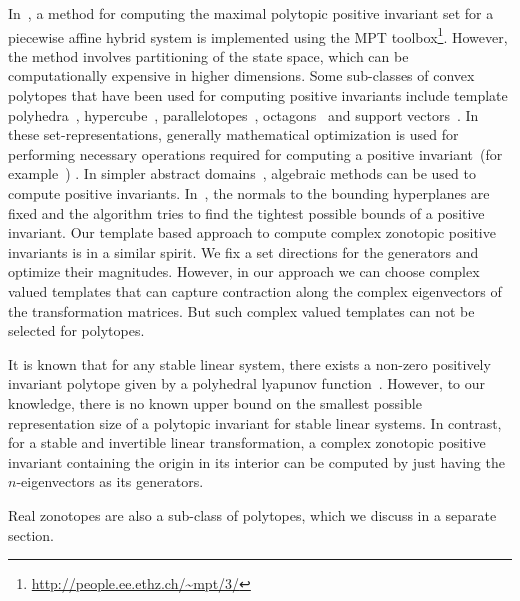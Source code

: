 In~\cite{rakovic2004computation}, a method for computing the maximal
polytopic positive invariant set for a piecewise affine hybrid system
is implemented using the MPT
toolbox\footnote{\url{http://people.ee.ethz.ch/~mpt/3/}}.  However,
the method involves partitioning of the state space, which can be
computationally expensive in higher dimensions.  Some sub-classes of
convex polytopes that have been used for computing positive invariants
include template
polyhedra~\cite{Gawlitza,Sankaranarayanan+Dang+Ivancic-08-Symbolic},
hypercube~\cite{cousot1976static,tiwari2008generating},
parallelotopes~\cite{amato2012abstract},
octagons~\cite{DBLP:journals/lisp/Mine06} and support
vectors~\cite{FLD+11}.  In these set-representations, generally
mathematical optimization is used for performing necessary operations
required for computing a positive invariant~(for
example~\cite{Gawlitza,dang1998reachability}) .  In simpler abstract
domains~\cite{DBLP:journals/lisp/Mine06,cousot1976static,amato2012abstract},
algebraic methods can be used to compute positive invariants.
In~\cite{Gawlitza}, the normals to the bounding hyperplanes are fixed
and the algorithm tries to find the tightest possible bounds
of a positive invariant.  Our template based approach to
compute complex zonotopic positive invariants is in a similar spirit.
We fix a set directions for the generators and optimize their
magnitudes.  However, in our approach we can choose complex valued
templates that can capture contraction along the complex eigenvectors
of the transformation matrices.  But such complex valued templates can
not be selected for polytopes.

It is known that for any stable linear system, there exists a non-zero
positively invariant polytope given by a polyhedral lyapunov
function~\cite{blanchini2008set}.  However, to our knowledge, there is
no known upper bound on the smallest possible representation size of a
polytopic invariant for stable linear systems.  In contrast, for a stable and
invertible linear transformation, a complex zonotopic positive
invariant containing the origin in its interior can be computed by
just having the $n$-eigenvectors as its generators.

Real zonotopes are also a sub-class of polytopes, which we discuss in
a separate section.

          
